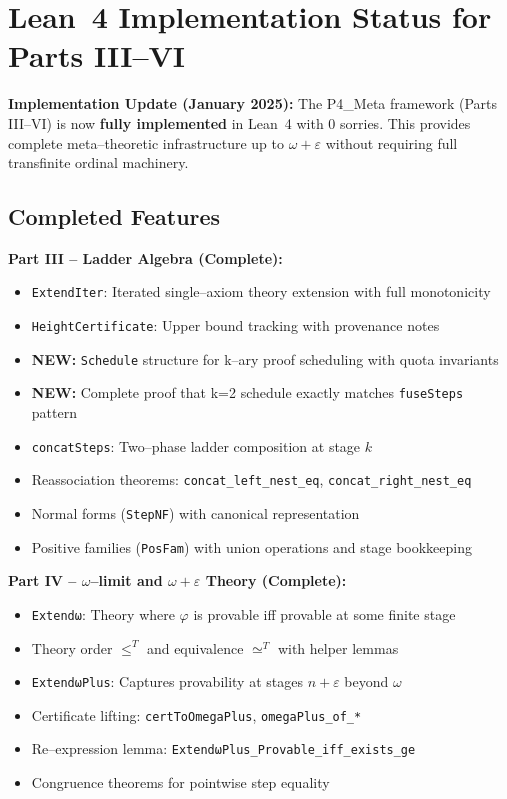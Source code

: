 \documentclass[11pt]{article}
\theoremstyle{definition}
\theoremstyle{remark}
\begin{document}
\section{Lean~4 Implementation Status for Parts III--VI}

\begin{mdframed}[style=status]
\textbf{Implementation Update (January 2025):} The P4\_Meta framework (Parts III--VI) is now \textbf{fully implemented} in Lean~4 with 0 sorries. This provides complete meta--theoretic infrastructure up to $\omega+\varepsilon$ without requiring full transfinite ordinal machinery.
\end{mdframed}

\subsection*{Completed Features}

\textbf{Part III -- Ladder Algebra (Complete):}
\begin{itemize}
\item \texttt{ExtendIter}: Iterated single--axiom theory extension with full monotonicity
\item \texttt{HeightCertificate}: Upper bound tracking with provenance notes
\item \textbf{NEW:} \texttt{Schedule} structure for k--ary proof scheduling with quota invariants
\item \textbf{NEW:} Complete proof that k=2 schedule exactly matches \texttt{fuseSteps} pattern
\item \texttt{concatSteps}: Two--phase ladder composition at stage $k$
\item Reassociation theorems: \texttt{concat\_left\_nest\_eq}, \texttt{concat\_right\_nest\_eq}
\item Normal forms (\texttt{StepNF}) with canonical representation
\item Positive families (\texttt{PosFam}) with union operations and stage bookkeeping
\end{itemize}

\textbf{Part IV -- $\omega$--limit and $\omega+\varepsilon$ Theory (Complete):}
\begin{itemize}
\item \texttt{Extendω}: Theory where $\varphi$ is provable iff provable at some finite stage
\item Theory order $\leq^T$ and equivalence $\simeq^T$ with helper lemmas
\item \texttt{ExtendωPlus}: Captures provability at stages $n+\varepsilon$ beyond $\omega$
\item Certificate lifting: \texttt{certToOmegaPlus}, \texttt{omegaPlus\_of\_*}
\item Re--expression lemma: \texttt{ExtendωPlus\_Provable\_iff\_exists\_ge}
\item Congruence theorems for pointwise step equality
\end{itemize}
\end{document}
